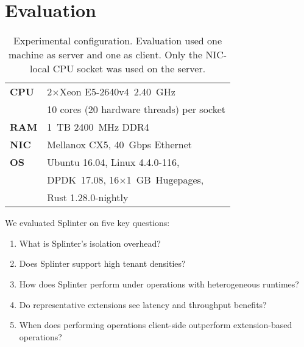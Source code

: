 \section{Evaluation}
\label{sec:evaluation}

\begin{table}[t]
\centering
\begin{tabular}{p{} p{}}
\toprule
\textbf{CPU} & 2$\times$Xeon E5-2640v4~2.40~GHz\\
  & 10 cores (20 hardware threads) per socket
\\
\midrule
\textbf{RAM} & 1~TB 2400~MHz DDR4
\\
\midrule
\textbf{NIC} & Mellanox CX5, 40~Gbps Ethernet
\\
\midrule
\textbf{OS} & Ubuntu 16.04, Linux 4.4.0-116,\\
        & DPDK~17.08, 16$\times$1~GB~Hugepages,\\
        & Rust 1.28.0-nightly
\\
\bottomrule
\end{tabular}
\caption{Experimental configuration. Evaluation used
one machine as server and one as client.
Only the NIC-local CPU socket was used on the server.}
\label{table:setup}
\end{table}

We evaluated Splinter on five key questions:


\begin{enumerate}
\item What is Splinter's isolation overhead?
\item Does Splinter support high tenant densities?
\item How does Splinter perform under operations with heterogeneous runtimes?
\item Do representative extensions see latency and throughput benefits?
\item When does performing operations client-side outperform extension-based operations?
\end{enumerate}

